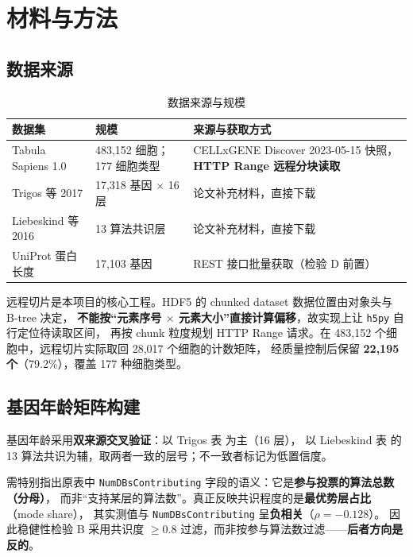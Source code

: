 \documentclass{cjc}
\begin{document}
\section{材料与方法}

\subsection{数据来源}

\begin{table}[t]
  \centering
  \caption{数据来源与规模}
  \label{tab:data}
  \small
  \begin{tabularx}{\textwidth}{@{}p{3.0cm}p{3.1cm}X@{}}
    \toprule
    数据集 & 规模 & 来源与获取方式 \\
    \midrule
    Tabula Sapiens 1.0 & 483,152 细胞；177 细胞类型 & CELLxGENE Discover 2023-05-15 快照，\textbf{HTTP Range 远程分块读取}\cite{tabulaspians2022} \\
    Trigos 等 2017 & 17,318 基因 $\times$ 16 层 & 论文补充材料，直接下载\cite{trigos2017} \\
    Liebeskind 等 2016 & 13 算法共识层 & 论文补充材料，直接下载\cite{liebeskind2016} \\
    UniProt 蛋白长度 & 17,103 基因 & REST 接口批量获取（检验 D 前置） \\
    \bottomrule
  \end{tabularx}
\end{table}

远程切片是本项目的核心工程。HDF5 的 chunked dataset 数据位置由对象头与 B-tree 决定，
\textbf{不能按“元素序号 $\times$ 元素大小”直接计算偏移}，故实现上让 \texttt{h5py} 自行定位待读取区间，
再按 chunk 粒度规划 HTTP Range 请求。在 483,152 个细胞中，远程切片实际取回 28,017 个细胞的计数矩阵，
经质量控制后保留 \textbf{22,195 个}（79.2\%），覆盖 177 种细胞类型。

\subsection{基因年龄矩阵构建}

基因年龄采用\textbf{双来源交叉验证}：以 Trigos 表\cite{trigos2017} 为主（16 层），
以 Liebeskind 表\cite{liebeskind2016} 的 13 算法共识为辅，取两者一致的层号；不一致者标记为低置信度。

需特别指出原表中 \texttt{NumDBsContributing} 字段的语义：它是\textbf{参与投票的算法总数（分母）}，
而非“支持某层的算法数”。真正反映共识程度的是\textbf{最优势层占比}（mode share），
其实测值与 \texttt{NumDBsContributing} 呈\textbf{负相关}（$\rho = -0.128$）。
因此稳健性检验 B 采用共识度 $\ge 0.8$ 过滤，而非按参与算法数过滤——\textbf{后者方向是反的}。
\end{document}
